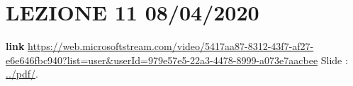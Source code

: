 \section*{LEZIONE 11 08/04/2020}
\textbf{link} \url{https://web.microsoftstream.com/video/5417aa87-8312-43f7-af27-e6e646fbc940?list=user&userId=979e57e5-22a3-4478-8999-a073e7aacbee}\newline
\newline
Slide : \url{../pdf/}.